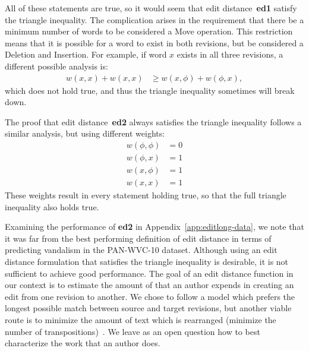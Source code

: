 All of these statements are true, so it would seem that
edit distance~\textbf{ed1} satisfy the triangle inequality.
The complication arises in the requirement
that there be a minimum number of words to be considered a
Move operation.
This restriction means that it is possible for a word to exist
in both revisions, but be considered a Deletion and Insertion.
For example, if word $x$ exists in all three revisions, a different
possible analysis is:
  \begin{align*}
    w(x, x) + w(x, x) & \ge w(x, \phi) + w(\phi, x),
  \end{align*}
which does not hold true, and thus the triangle inequality sometimes
will break down.

\bigskip

The proof that edit distance~\textbf{ed2} always satisfies the
triangle inequality follows a similar analysis, but using different
weights:
\begin{align*}
  w(\phi, \phi) &= 0 \\
  w(\phi, x) &= 1 \\
  w(x, \phi) &= 1 \\
  w(x, x) &= 1
\end{align*}
These weights result in every statement holding true, so that the
full triangle inequality also holds true.

Examining the performance of \textbf{ed2} in
Appendix~\ref{app:editlong-data}, we note that it was far from the best
performing definition of edit distance in terms of predicting vandalism
in the PAN-WVC-10 dataset.
Although using an edit distance formulation that satisfies the triangle
inequality is desirable, it is not sufficient to achieve good
performance.
The goal of an edit distance function in our context is to estimate
the amount of  that an author expends in creating an
edit from one revision to another.
We chose to follow a model which prefers the longest possible match
between source and target revisions, but another viable route is to
minimize the amount of text which is rearranged (\ie minimize the
number of transpositions)~\cite{Wagner1975}.
We leave as an open question how to best characterize the work
that an author does.

